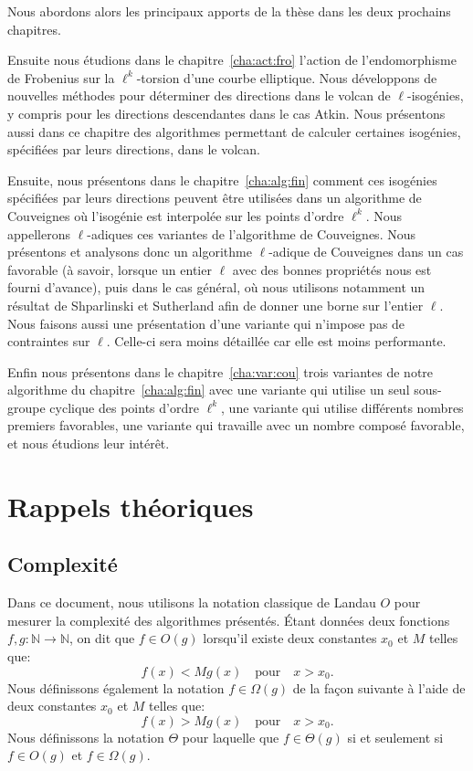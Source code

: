 \documentclass[10pt,a4paper]{book}
\theoremstyle{plain}
\theoremstyle{definition}
\theoremstyle{definition}
\theoremstyle{definition}
\theoremstyle{definition}
\theoremstyle{definition}
\theoremstyle{remark}
\theoremstyle{remark}
\theoremstyle{definition}
\begin{document}
Nous abordons alors les principaux apports de la thèse dans les deux prochains
chapitres.

Ensuite nous étudions dans le chapitre~\ref{cha:act:fro} l'action de 
l'endomorphisme de Frobenius sur la $\ell^k$-torsion d'une courbe elliptique. 
Nous  développons de nouvelles méthodes pour déterminer des directions dans le 
volcan de $\ell$-isogénies, y compris pour les directions descendantes dans le 
cas Atkin. Nous présentons aussi dans ce chapitre des 
algorithmes permettant de calculer certaines isogénies, spécifiées par leurs 
directions, dans le volcan. 

Ensuite, nous présentons dans le chapitre~\ref{cha:alg:fin} comment ces 
isogénies spécifiées 
par leurs directions peuvent être utilisées dans un algorithme de Couveignes
où l'isogénie est interpolée sur les points d'ordre $\ell^k$. Nous
appellerons $\ell$-adiques ces variantes de l'algorithme de Couveignes.
Nous présentons et analysons donc un algorithme $\ell$-adique de
Couveignes dans un cas favorable (à savoir, lorsque un entier $\ell$ avec des 
bonnes propriétés nous est fourni d'avance), puis dans le cas général, où nous 
utilisons notamment un résultat de Shparlinski et Sutherland 
\cite{ShparlinskiSutherland14} afin de donner une borne sur l'entier $\ell$. 
Nous faisons aussi une présentation d'une variante qui n'impose pas de contraintes 
sur $\ell$. Celle-ci sera moins détaillée car elle est moins performante.

Enfin nous présentons dans le chapitre~\ref{cha:var:cou} trois variantes de notre
algorithme du chapitre~\ref{cha:alg:fin} 
avec une variante qui utilise un seul sous-groupe cyclique des points d'ordre $\ell^k$,
une variante qui utilise différents nombres premiers favorables,
une variante qui travaille avec un nombre composé favorable,
et nous étudions leur intérêt. 


\chapter{Rappels théoriques}
\label{cha:rappel}
\section{Complexit\'e}
Dans ce document, nous utilisons la notation classique de Landau $O$ pour mesurer la 
complexité des algorithmes présentés. Étant données deux fonctions $f,g: \mathbb{N} \rightarrow \mathbb{N}$, on dit que $f \in O(g)$ lorsqu'il existe deux constantes $x_0$ et $M$ telles que:
\[
f(x)<Mg(x) \quad \text{pour} \quad x>x_0.
\]
Nous définissons également la notation $f \in \Omega(g)$ de la façon suivante à l'aide de deux constantes $x_0$ et $M$ telles que: 
\[
f(x)>Mg(x) \quad \text{pour} \quad x>x_0.
\]
Nous définissons la notation $\Theta$ pour laquelle que $f \in \Theta(g)$ si et seulement si $f \in O(g)$ et $f \in \Omega(g)$.
\end{document}

